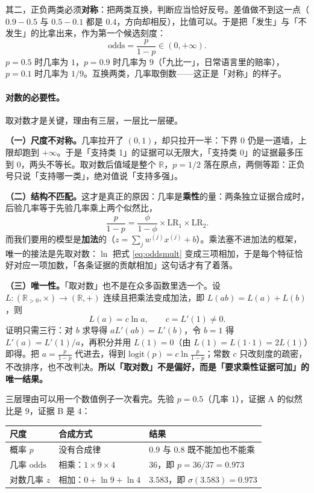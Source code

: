 \documentclass[11pt,a4paper,fontset=windows,zihao=-4]{ctexart}
\newcommand{\R}{\mathbb{R}}
\newcommand{\tabhead}{\sffamily\bfseries\color{navy}}
\begin{document}
其二，正负两类必须\textbf{对称}：把两类互换，判断应当恰好反号。差值做不到这一点（$0.9-0.5$ 与 $0.5-0.1$ 都是 $0.4$，方向却相反），比值可以。于是把「发生」与「不发生」的比拿出来，作为第一个候选刻度：
\begin{equation}
  \mathrm{odds}=\frac{p}{1-p}\in(0,+\infty).
\end{equation}
$p=0.5$ 时几率为 $1$，$p=0.9$ 时几率为 $9$（「九比一」，日常语言里的赔率），$p=0.1$ 时几率为 $1/9$。互换两类，几率取倒数——这正是「对称」的样子。

\paragraph{对数的必要性。}取对数才是关键，理由有三层，一层比一层硬。

\textbf{（一）尺度不对称。}几率拉开了 $(0,1)$，却只拉开一半：下界 $0$ 仍是一道墙，上限却跑到 $+\infty$。于是「支持类 1」的证据可以无限大，「支持类 0」的证据最多压到 $0$，两头不等长。取对数后值域是整个 $\R$，$p=1/2$ 落在原点，两侧等距：正负号只说「支持哪一类」，绝对值说「支持多强」。

\textbf{（二）结构不匹配。}这才是真正的原因：几率是\textbf{乘性}的量：两条独立证据合成时，后验几率等于先验几率乘上两个似然比，
\begin{equation}
  \frac{p}{1-p}=\frac{\phi}{1-\phi}\times\mathrm{LR}_1\times\mathrm{LR}_2 .
  \label{eq:oddsmult}
\end{equation}
而我们要用的模型是\textbf{加法}的（$z=\sum_j w^{(j)}x^{(j)}+b$）。乘法塞不进加法的框架，唯一的接法是先取对数：$\ln$ 把式 \eqref{eq:oddsmult} 变成三项相加，于是每个特征恰好对应一项加数，「各条证据的贡献相加」这句话才有了着落。

\textbf{（三）唯一性。}「取对数」也不是在众多函数里选一个。设 $L:(\R_{>0},\times)\to(\R,+)$ 连续且把乘法变成加法，即 $L(ab)=L(a)+L(b)$，则
\begin{equation}
  L(a)=c\ln a,\qquad c=L'(1)\ne0 .
  \label{eq:logunique}
\end{equation}
证明只需三行：对 $b$ 求导得 $aL'(ab)=L'(b)$，令 $b=1$ 得 $L'(a)=L'(1)/a$，再积分并用 $L(1)=0$（由 $L(1)=L(1\cdot1)=2L(1)$）即得。把 $a=\frac{p}{1-p}$ 代进去，得到 $\mathrm{logit}(p)=c\ln\frac{p}{1-p}$；常数 $c$ 只改刻度的疏密，不改排序，也不改判决。\textbf{所以「取对数」不是偏好，而是「要求乘性证据可加」的唯一结果。}

三层理由可以用一个数值例子一次看完。先验 $p=0.5$（几率 $1$），证据 A 的似然比是 $9$，证据 B 是 $4$：

\begin{center}
\small
\begin{tabular}{@{}lll@{}}
\toprule
\rowcolor{navy!7}
\tabhead 尺度 & \tabhead 合成方式 & \tabhead 结果\\
\midrule
概率 $p$ & 没有合成律 & $0.9$ 与 $0.8$ 既不能加也不能乘\\
几率 $\mathrm{odds}$ & 相乘：$1\times9\times4$ & $36$，即 $p=36/37=0.973$\\
对数几率 $z$ & 相加：$0+\ln9+\ln4$ & $3.583$，即 $\sigma(3.583)=0.973$\\
\bottomrule
\end{tabular}
\end{center}
\end{document}
